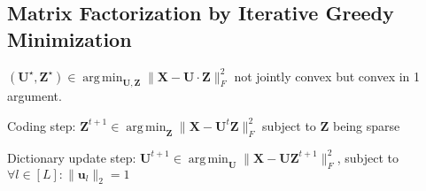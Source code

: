 \documentclass[a4paper, 11pt, landscape]{article}
\DeclareMathOperator*{\argmin}{arg\,min}
\DeclareMathOperator*{\argmax}{arg\,max}
\begin{document}
\begin{multicols*}{3}
\subsection{Matrix Factorization by Iterative Greedy Minimization}
$(\mathbf{U}^\star, \mathbf{Z}^\star) \in \argmin_\mathbf{U,Z} \| \mathbf{X} - \mathbf{U} \cdot \mathbf{Z} \|_F^2$ not jointly convex but convex in 1 argument.
\begin{inparaenum}
  \item Coding step: $\mathbf{Z}^{t+1} \in \argmin_\mathbf{Z} \| \mathbf{X} - \mathbf{U}^t \mathbf{Z} \|_F^2$ subject to $\mathbf{Z}$ being sparse
  \item Dictionary update step: $\mathbf{U}^{t+1} \in \argmin_\mathbf{U} \| \mathbf{X} - \mathbf{UZ}^{t+1} \|_F^2$, subject to $\forall l\in [L]:\|\mathbf{u}_l\|_2 = 1$
\end{inparaenum}




\end{multicols*}
\end{document}
